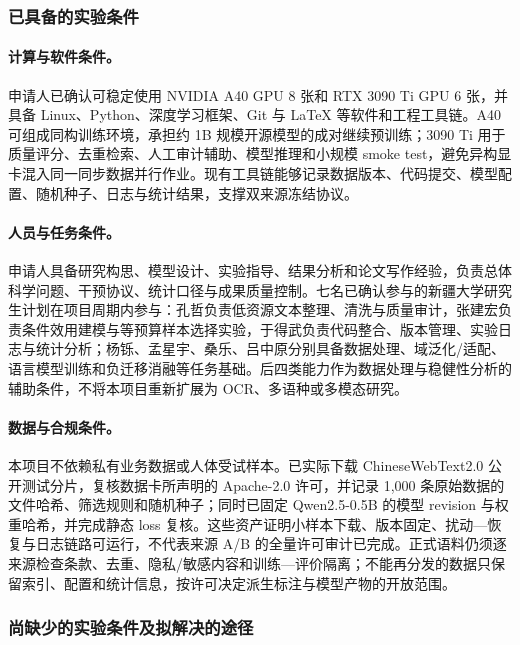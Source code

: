 \justifying
\NSFCBodyText

\subsubsection{已具备的实验条件}

\paragraph{计算与软件条件。}申请人已确认可稳定使用 NVIDIA A40 GPU 8 张和 RTX 3090 Ti GPU 6 张，并具备 Linux、Python、深度学习框架、Git 与 LaTeX 等软件和工程工具链。A40 可组成同构训练环境，承担约 1B 规模开源模型的成对继续预训练；3090 Ti 用于质量评分、去重检索、人工审计辅助、模型推理和小规模 smoke test，避免异构显卡混入同一同步数据并行作业。现有工具链能够记录数据版本、代码提交、模型配置、随机种子、日志与统计结果，支撑双来源冻结协议。

\paragraph{人员与任务条件。}申请人具备研究构思、模型设计、实验指导、结果分析和论文写作经验，负责总体科学问题、干预协议、统计口径与成果质量控制。七名已确认参与的新疆大学研究生计划在项目周期内参与：孔哲负责低资源文本整理、清洗与质量审计，张建宏负责条件效用建模与等预算样本选择实验，于得武负责代码整合、版本管理、实验日志与统计分析；杨铄、孟星宇、桑乐、吕中原分别具备数据处理、域泛化/适配、语言模型训练和负迁移消融等任务基础。后四类能力作为数据处理与稳健性分析的辅助条件，不将本项目重新扩展为 OCR、多语种或多模态研究。

\paragraph{数据与合规条件。}本项目不依赖私有业务数据或人体受试样本。已实际下载 ChineseWebText2.0 公开测试分片，复核数据卡所声明的 Apache-2.0 许可，并记录 1,000 条原始数据的文件哈希、筛选规则和随机种子；同时已固定 Qwen2.5-0.5B 的模型 revision 与权重哈希，并完成静态 loss 复核。这些资产证明小样本下载、版本固定、扰动—恢复与日志链路可运行，不代表来源 A/B 的全量许可审计已完成。正式语料仍须逐来源检查条款、去重、隐私/敏感内容和训练—评价隔离；不能再分发的数据只保留索引、配置和统计信息，按许可决定派生标注与模型产物的开放范围。

\subsubsection{尚缺少的实验条件及拟解决的途径}

